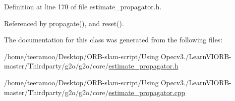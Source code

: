 Definition at line 170 of file estimate\+\_\+propagator.\+h.



Referenced by propagate(), and reset().



The documentation for this class was generated from the following files\+:\begin{DoxyCompactItemize}
\item 
/home/teeramoo/\+Desktop/\+O\+R\+B-\/slam-\/script/\+Using Opecv3./\+Learn\+V\+I\+O\+R\+B-\/master/\+Thirdparty/g2o/g2o/core/\hyperlink{estimate__propagator_8h}{estimate\+\_\+propagator.\+h}\item 
/home/teeramoo/\+Desktop/\+O\+R\+B-\/slam-\/script/\+Using Opecv3./\+Learn\+V\+I\+O\+R\+B-\/master/\+Thirdparty/g2o/g2o/core/\hyperlink{estimate__propagator_8cpp}{estimate\+\_\+propagator.\+cpp}\end{DoxyCompactItemize}
